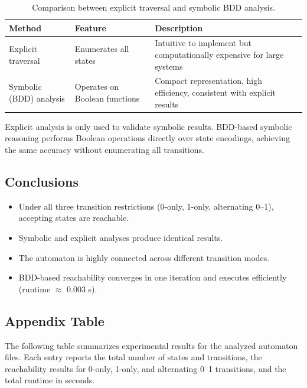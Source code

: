 \documentclass{article}
\begin{document}
\begin{table}[h]
\centering
\begin{tabular}{l|l|p{7cm}}
\textbf{Method} & \textbf{Feature} & \textbf{Description} \\\hline
Explicit traversal & Enumerates all states & Intuitive to implement but computationally expensive for large systems \\
Symbolic (BDD) analysis & Operates on Boolean functions & Compact representation, high efficiency, consistent with explicit results \\
\end{tabular}
\caption{Comparison between explicit traversal and symbolic BDD analysis.}
\end{table}

Explicit analysis is only used to validate symbolic results.
BDD-based symbolic reasoning performs Boolean operations directly over state encodings,
achieving the same accuracy without enumerating all transitions.



\subsection*{Conclusions}

\begin{itemize}
  \item Under all three transition restrictions (0-only, 1-only, alternating 0–1),
        accepting states are reachable.
  \item Symbolic and explicit analyses produce identical results.
  \item The automaton is highly connected across different transition modes.
  \item BDD-based reachability converges in one iteration and executes efficiently
        (runtime $\approx$ 0.003 s).
\end{itemize}



\subsection*{Appendix Table}

The following table summarizes experimental results for the analyzed automaton files.
Each entry reports the total number of states and transitions,
the reachability results for 0-only, 1-only, and alternating 0–1 transitions,
and the total runtime in seconds.
\end{document}
